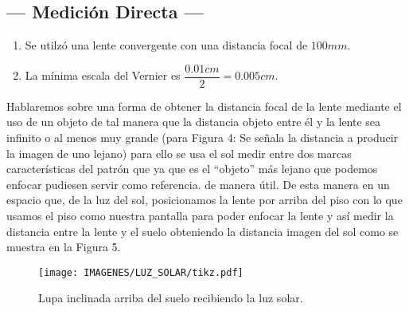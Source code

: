 \documentclass[10pt,a4paper]{article}
\begin{document}
\subsection{--- Medición Directa ---} %
\label{sub:medicion_directa}
\begin{enumerate}[noitemsep]
	\item Se utilzó una lente convergente con una distancia focal de \(100mm\).
	\item La mínima escala del Vernier es $\dfrac{0.01 cm}{2}=0.005 cm$.
\end{enumerate}
Hablaremos sobre una forma de obtener la distancia focal de la lente mediante el uso de un objeto de tal manera que la distancia objeto entre él y la lente sea infinito o al menos muy grande (para Figura 4: Se señala la distancia a producir la imagen de uno lejano) para ello se usa el sol medir entre dos marcas características del patrón que ya que es el “objeto” más lejano que podemos enfocar pudiesen servir como referencia. de manera útil. De esta manera en un espacio que, de la luz del sol, posicionamos la lente por arriba del piso con lo que usamos el piso como nuestra pantalla para poder enfocar la lente y así medir la distancia entre la lente y el suelo obteniendo la distancia imagen del sol como se muestra en la Figura 5.
\begin{figure}[ht]
	\centering
	\texttt{[image: IMAGENES/LUZ\_SOLAR/tikz.pdf]}
	\caption{Lupa inclinada arriba del suelo recibiendo la luz solar.}
	\label{fig:solar}
\end{figure}
\end{document}

